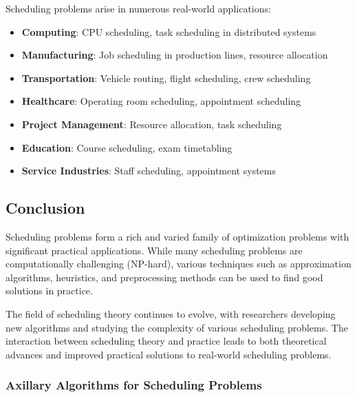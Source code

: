 \documentclass{article}
\theoremstyle{definition}
\begin{document}
Scheduling problems arise in numerous real-world applications:

\begin{itemize}
    \item \textbf{Computing}: CPU scheduling, task scheduling in distributed systems
    \item \textbf{Manufacturing}: Job scheduling in production lines, resource allocation
    \item \textbf{Transportation}: Vehicle routing, flight scheduling, crew scheduling
    \item \textbf{Healthcare}: Operating room scheduling, appointment scheduling
    \item \textbf{Project Management}: Resource allocation, task scheduling
    \item \textbf{Education}: Course scheduling, exam timetabling
    \item \textbf{Service Industries}: Staff scheduling, appointment systems
\end{itemize}

\subsection*{Conclusion}

Scheduling problems form a rich and varied family of optimization problems with significant practical applications. While many scheduling problems are computationally challenging (NP-hard), various techniques such as approximation algorithms, heuristics, and preprocessing methods can be used to find good solutions in practice.

The field of scheduling theory continues to evolve, with researchers developing new algorithms and studying the complexity of various scheduling problems. The interaction between scheduling theory and practice leads to both theoretical advances and improved practical solutions to real-world scheduling problems.

\subsubsection{Axillary Algorithms for Scheduling Problems}
\end{document}
